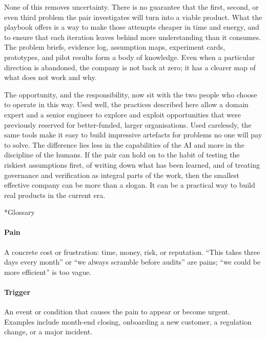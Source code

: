 \documentclass[10pt, a4paper, twocolumn]{article} %
\makeatletter
\let\orig@section\section %
\renewcommand{\section}{%
  \@ifstar{\orig@section*}{\unnumberedsteppingsection}%
}
\newcommand{\unnumberedsteppingsection}[1]{%
  \refstepcounter{section}%
  \orig@section*{#1}%
}
\makeatother
\begin{document}
None of this removes uncertainty. There is no guarantee that the first, second, or even third problem the pair investigates will turn into a viable product. What the playbook offers is a way to make those attempts cheaper in time and energy, and to ensure that each iteration leaves behind more understanding than it consumes. The problem briefs, evidence log, assumption maps, experiment cards, prototypes, and pilot results form a body of knowledge. Even when a particular direction is abandoned, the company is not back at zero; it has a clearer map of what does not work and why.

The opportunity, and the responsibility, now sit with the two people who choose to operate in this way. Used well, the practices described here allow a domain expert and a senior engineer to explore and exploit opportunities that were previously reserved for better-funded, larger organisations. Used carelessly, the same tools make it easy to build impressive artefacts for problems no one will pay to solve. The difference lies less in the capabilities of the AI and more in the discipline of the humans. If the pair can hold on to the habit of testing the riskiest assumptions first, of writing down what has been learned, and of treating governance and verification as integral parts of the work, then the smallest effective company can be more than a slogan. It can be a practical way to build real products in the current era.








\onecolumn
\section*{Glossary}

\paragraph{Pain} A concrete cost or frustration: time, money, risk, or reputation. “This takes three days every month” or “we always scramble before audits” are pains; “we could be more efficient” is too vague.

\paragraph{Trigger} An event or condition that causes the pain to appear or become urgent. Examples include month-end closing, onboarding a new customer, a regulation change, or a major incident.
\end{document}
